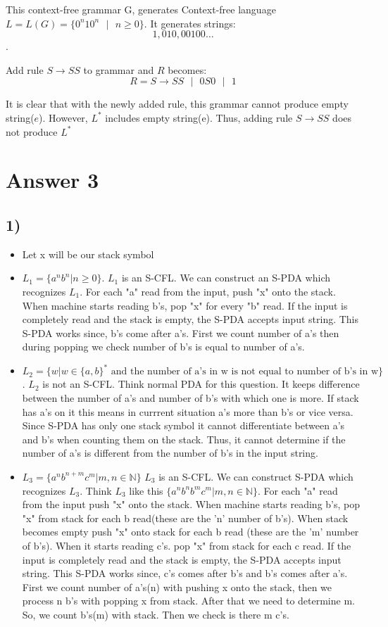 \documentclass[12pt]{article}
\begin{document}
This context-free grammar G, generates Context-free language $L = L(G) = \{0^n10^n \mbox{ }| \mbox{ } n \geq 0 \}$. It generates strings: 
$$1, 010, 00100 \dots$$. 

Add rule $S \rightarrow SS$ to grammar and $R$ becomes: 
$$R = S \rightarrow SS \mbox{ } | \mbox{ } 0S0 \mbox{ } | \mbox{ } 1  $$

It is clear that with the newly added rule, this grammar cannot produce empty string($e$). However, $L^*$ includes empty string(e). Thus, adding rule $S \rightarrow SS $ does not produce $L^*$
\section*{Answer 3}
\subsection*{1)}
\begin{itemize}
    \item Let x will be our stack symbol
    \item $L_1 = \{a^nb^n | n \geq 0\}$. $L_1$ is an S-CFL. We can construct an S-PDA which recognizes $L_1$. For each "a" read from the input, push "x" onto the stack. When machine starts reading b's, pop "x" for every "b" read. If the input is completely read and the stack is empty, the S-PDA accepts input string. This S-PDA works since, b's come after a's. First we count number of a's then during popping we check number of b's is equal to number of a's. 
    \item $L_2 = \{w | w \in \{a,b\}^* \mbox{ and the number of a's in w is not equal to number of b's in w}\}$. $L_2$ is not an S-CFL. Think normal PDA for this question. It keeps difference between the number of a's and number of b's with which one is more. If stack has a's on it this means in currrent situation a's more than b's or vice versa. Since S-PDA has only one stack symbol it cannot differentiate between a's and b's when counting them on the stack. Thus, it cannot determine if the number of a's is different from the number of b's in the input string. 
    \item $L_3 = \{a^nb^{n+m}c^m | m,n  \in \mathbb{N}\}$ $L_3$ is an S-CFL. We can construct S-PDA which recognizes $L_3$. Think $L_3$ like this $\{a^nb^nb^mc^m | m,n \in \mathbb{N}\}$. For each "a" read from the input push "x" onto the stack. When machine starts reading b's, pop "x" from stack for each b read(these are the 'n' number of b's). When stack becomes empty push "x" onto stack for each b read (these are the 'm' number of b's). When it starts reading c's. pop "x" from stack for each c read. If the input is completely read and the stack is empty, the S-PDA accepts input string. This S-PDA works since, c's comes after b's and b's comes after a's. First we count number of a's(n) with pushing x onto the stack, then we process n b's with popping x from stack. After that we need to determine m. So, we count b's(m) with stack. Then we check is there m c's. 
\end{itemize}
\end{document}
